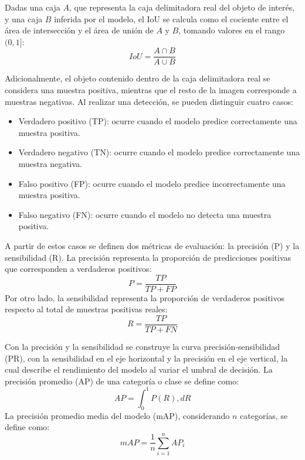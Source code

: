 Dadas una caja $A$, que representa la caja delimitadora real del objeto de interés, y una caja $B$ inferida por el modelo, el IoU se calcula como el cociente entre el área de intersección y el área de unión de $A$ y $B$, tomando valores en el rango $(0,1]$:
\begin{equation}
IoU=\frac{A\cap B}{A\cup B}
\end{equation}

Adicionalmente, el objeto contenido dentro de la caja delimitadora real se considera una muestra positiva, mientras que el resto de la imagen corresponde a muestras negativas. Al realizar una detección, se pueden distinguir cuatro casos:
\begin{itemize}
    \item Verdadero positivo (TP): ocurre cuando el modelo predice correctamente una muestra positiva.
    \item Verdadero negativo (TN): ocurre cuando el modelo predice correctamente una muestra negativa.
    \item Falso positivo (FP): ocurre cuando el modelo predice incorrectamente una muestra positiva.
    \item Falso negativo (FN): ocurre cuando el modelo no detecta una muestra positiva.
\end{itemize}

A partir de estos casos se definen dos métricas de evaluación: la precisión (P) y la sensibilidad (R). La precisión representa la proporción de predicciones positivas que corresponden a verdaderos positivos:
\begin{equation}
    P = \frac{TP}{TP + FP}
\end{equation}
Por otro lado, la sensibilidad representa la proporción de verdaderos positivos respecto al total de muestras positivas reales:
\begin{equation}
    R = \frac{TP}{TP + FN}
\end{equation}

Con la precisión y la sensibilidad se construye la curva precisión-sensibilidad (PR), con la sensibilidad en el eje horizontal y la precisión en el eje vertical, la cual describe el rendimiento del modelo al variar el umbral de decisión. La precisión promedio (AP) de una categoría o clase se define como:
\begin{equation}
    AP = \int_{0}^{1} P(R),dR
\end{equation}
La precisión promedio media del modelo (mAP), considerando $n$ categorías, se define como:
\begin{equation}
    mAP=\frac{1}{n}\sum_{i=1}^{n}AP_{i}
\end{equation}
\parencite{zeng2026deep}

